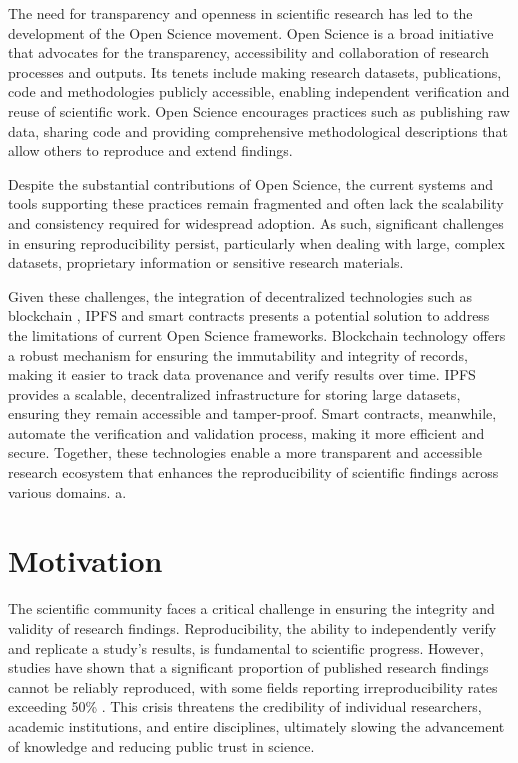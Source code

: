 \documentclass[final]{rc-book-2.14}
\begin{document}
The need for transparency and openness in scientific research has led to the development of the Open Science movement. Open Science is a broad initiative that advocates for the transparency, accessibility and collaboration of research processes and outputs. Its tenets include making research datasets, publications, code and methodologies publicly accessible, enabling independent verification and reuse of scientific work. Open Science encourages practices such as publishing raw data, sharing code and providing comprehensive methodological descriptions that allow others to reproduce and extend findings.

Despite the substantial contributions of Open Science, the current systems and tools supporting these practices remain fragmented and often lack the scalability and consistency required for widespread adoption. As such, significant challenges in ensuring reproducibility persist, particularly when dealing with large, complex datasets, proprietary information  or sensitive research materials.

Given these challenges, the integration of decentralized technologies such as blockchain \cite{nakamoto2012bitcoin}, IPFS \cite{Benet} and smart contracts \cite{Szabo-1994}presents a potential solution to address the limitations of current Open Science frameworks. Blockchain technology offers a robust mechanism for ensuring the immutability and integrity of records, making it easier to track data provenance and verify results over time. IPFS provides a scalable, decentralized infrastructure for storing large datasets, ensuring they remain accessible and tamper-proof. Smart contracts, meanwhile, automate the verification and validation process, making it more efficient and secure. Together, these technologies enable a more transparent and accessible research ecosystem that enhances the reproducibility of scientific findings across various domains.
a.


\section{Motivation}
\label{sec:introduction:motivation}

The scientific community faces a critical challenge in ensuring the integrity and validity of research findings. Reproducibility, the ability to independently verify and replicate a study’s results, is fundamental to scientific progress. However, studies have shown that a significant proportion of published research findings cannot be reliably reproduced, with some fields reporting irreproducibility rates exceeding 50\% \cite{baker2016reproducibility}. This crisis threatens the credibility of individual researchers, academic institutions, and entire disciplines, ultimately slowing the advancement of knowledge and reducing public trust in science.
\end{document}
